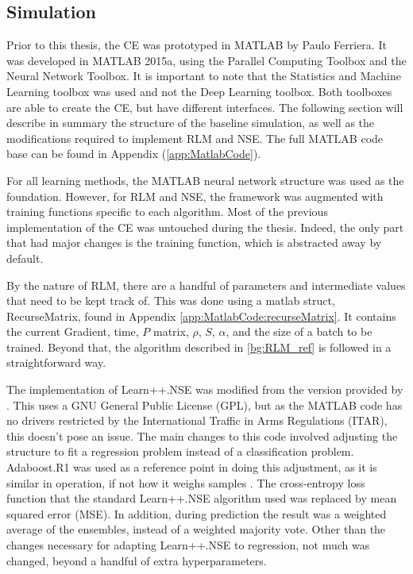 \subsection{Simulation}
\par Prior to this thesis, the CE was prototyped in MATLAB by Paulo Ferriera\cite{paulo_theory_paper}. It was developed in MATLAB 2015a, using the Parallel Computing Toolbox and the Neural Network Toolbox. It is important to note that the Statistics and Machine Learning toolbox was used and not the Deep Learning toolbox. Both toolboxes are able to create the CE, but have different interfaces. The following section will describe in summary the structure of the baseline simulation, as well as the modifications required to implement RLM and NSE. The full MATLAB code base can be found in Appendix (\ref{app:MatlabCode}).
\par For all learning methods, the MATLAB neural network structure was used as the foundation. However, for RLM and NSE, the framework was augmented with training functions specific to each algorithm. Most of the previous implementation of the CE was untouched during the thesis. Indeed, the only part that had major changes is the training function, which is abstracted away by default. 
\par By the nature of RLM, there are a handful of parameters and intermediate values that need to be kept track of. This was done using a matlab struct, RecurseMatrix, found in Appendix \ref{app:MatlabCode:recurseMatrix}. It contains the current Gradient, time, $P$ matrix, $\rho$, $S$, $\alpha$, and the size of a batch to be trained. Beyond that, the algorithm described in \ref{bg:RLM_ref} is followed in a straightforward way.   
\par  The implementation of Learn++.NSE was modified from the version provided by \cite{placeholderCitation}. 
This uses a GNU General Public License (GPL), but as the MATLAB code has no drivers restricted by the International Traffic in Arms Regulations (ITAR), this doesn't pose an issue. The main changes to this code involved adjusting the structure to fit a regression problem instead of a classification problem. Adaboost.R1 was used as a reference point in doing this adjustment, as it is similar in operation, if not how it weighs samples \cite{placeholderCitation}. The cross-entropy loss function that the standard Learn++.NSE algorithm used \cite{placeholderCitation} was replaced by mean squared error (MSE). In addition, during prediction the result was a weighted average of the ensembles, instead of a weighted majority vote. Other than the changes necessary for adapting Learn++.NSE to regression, not much was changed, beyond a handful of extra hyperparameters. 

